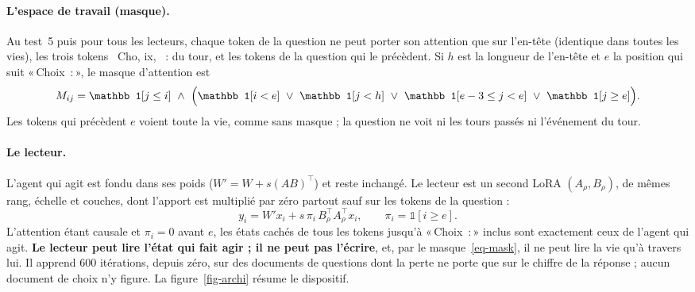 \documentclass[11pt,a4paper]{article}
\newcommand{\Choix}{«\,Choix~:\,»}
\begin{document}
\paragraph{L'espace de travail (masque).} Au test~5 puis pour tous les lecteurs,
chaque token de la question ne peut porter son attention que sur l'en-tête
(identique dans toutes les vies), les trois tokens \og\ Cho\fg{}, \og ix\fg{},
\og\ :\fg{} du tour, et les tokens de la question qui le précèdent. Si $h$ est la
longueur de l'en-tête et $e$ la position qui suit \Choix{}, le masque d'attention
est
\begin{equation}
M_{ij}=\mathbb 1[j\le i]\ \wedge\ \Bigl(\mathbb 1[i<e]\ \vee\ \mathbb 1[j<h]\ \vee\
\mathbb 1[e-3\le j<e]\ \vee\ \mathbb 1[j\ge e]\Bigr).
\label{eq-mask}
\end{equation}
Les tokens qui précèdent $e$ voient toute la vie, comme sans masque ; la question
ne voit ni les tours passés ni l'événement du tour.

\paragraph{Le lecteur.} L'agent qui agit est fondu dans ses poids
($W'=W+s(AB)^\top$) et reste inchangé. Le lecteur est un second LoRA
$(A_\rho,B_\rho)$, de mêmes rang, échelle et couches, dont l'apport est
multiplié par zéro partout sauf sur les tokens de la question :
\begin{equation}
y_i = W' x_i + s\,\pi_i\,B_\rho^{\top}A_\rho^{\top}x_i,\qquad \pi_i=\mathbb 1[i\ge e].
\label{eq-reader}
\end{equation}
L'attention étant causale et $\pi_i=0$ avant $e$, les états cachés de tous les
tokens jusqu'à \Choix{} inclus sont exactement ceux de l'agent qui agit.
\textbf{Le lecteur peut lire l'état qui fait agir ; il ne peut pas l'écrire}, et,
par le masque~\eqref{eq-mask}, il ne peut lire la vie qu'à travers lui. Il apprend
600 itérations, depuis zéro, sur des documents de questions dont la perte ne
porte que sur le chiffre de la réponse ; aucun document de choix n'y figure. La
figure~\ref{fig-archi} résume le dispositif.
\end{document}
